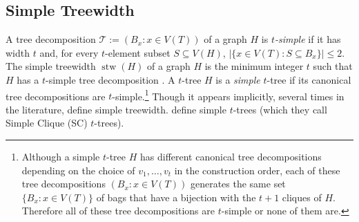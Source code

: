 \documentclass[kpfonts]{patmorin}
\DeclareMathOperator{\stw}{stw}
\theoremstyle{named}
\begin{document}
%
%
%
%

\subsection{Simple Treewidth}


A tree decomposition $\mathcal{T}:=(B_x:x\in V(T))$ of a graph $H$ is \emph{$t$-simple} if it has width $t$ and, for every $t$-element subset $S\subseteq V(H)$, $|\{x\in V(T):S\subseteq B_x\}|\le 2$.  The simple treewidth $\stw(H)$ of a graph $H$ is the minimum integer $t$ such that $H$ has a $t$-simple tree decomposition \cite{knauer.ueckerdt:simple}.  A $t$-tree $H$ is a \emph{simple} $t$-tree if its canonical tree decompositions are $t$-simple.\footnote{Although a simple $t$-tree $H$ has different canonical tree decompositions depending on the choice of $v_1,\ldots,v_t$ in the construction order, each of these tree decompositions $(B_x:x\in V(T))$ generates the same set $\{B_x:x\in V(T)\}$ of bags that have a bijection with the $t+1$ cliques of $H$.  Therefore all of these tree decompositions are $t$-simple or none of them are.}  Though it appears implicitly, several times in the literature, \citet{knauer.ueckerdt:simple} define simple treewidth.  \citet{markenzon.justel.ea:subclasses} define simple $t$-trees (which they call Simple Clique (SC) $t$-trees).
\end{document}
